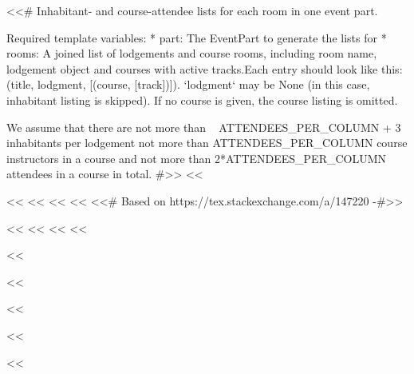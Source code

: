 <<# Inhabitant- and course-attendee lists for each room in one event part.

    Required template variables:
    * part: The EventPart to generate the lists for
    * rooms: A joined list of lodgements and course rooms, including room name, lodgement object and courses with active
      tracks.Each entry should look like this: (title, lodgment, [(course, [track])]). `lodgment` may be None (in this
      case, inhabitant listing is skipped). If no course is given, the course listing is omitted.

    We assume that there are not more than ~ ATTENDEES_PER_COLUMN + 3 inhabitants per lodgement not more than
    ATTENDEES_PER_COLUMN course instructors in a course and not more than 2*ATTENDEES_PER_COLUMN attendees in a course
    in total.
#>>
<<%


<<%
    <<%
        <<%
            <<%
                <<# Based on https://tex.stackexchange.com/a/147220 -#>>
            <<%
        <<%
    <<%
<<%

<<%

<<%
    \usepackage{enumitem}
    \usepackage{tikz}
    \usetikzlibrary{calc}
<<%

<<%
    \geometry{top=1cm,bottom=2cm,left=2cm,right=2cm,foot=1cm}

    \ihead[]{}
    \chead[]{}
    \ohead[]{}
    \ifoot[]{\rightmark}
    \cfoot[]{}

<<%

